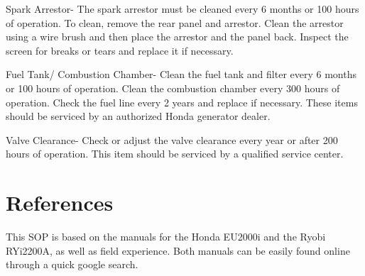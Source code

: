 \documentclass[12pt]{../SOP3_beta}
\begin{document}
\NP Spark Arrestor- The spark arrestor must be cleaned every 6 months or 100 hours of operation. To clean, remove the rear panel and arrestor. Clean the arrestor using a wire brush and then place the arrestor and the panel back. Inspect the screen for breaks or tears and replace it if necessary.

\NP Fuel Tank/ Combustion Chamber- Clean the fuel tank and filter every 6 months or 100 hours of operation. Clean the combustion chamber every 300 hours of operation. Check the fuel line every 2 years and replace if necessary. These items should be serviced by an authorized Honda generator dealer.

\NP Valve Clearance- Check or adjust the valve clearance every year or after 200 hours of operation. This item should be serviced by a qualified service center.




\section{References}

\NP This SOP is based on the manuals for the Honda EU2000i and the Ryobi RYi2200A, as well as field experience. Both manuals can be easily found online through a quick google search.  
\end{document}
